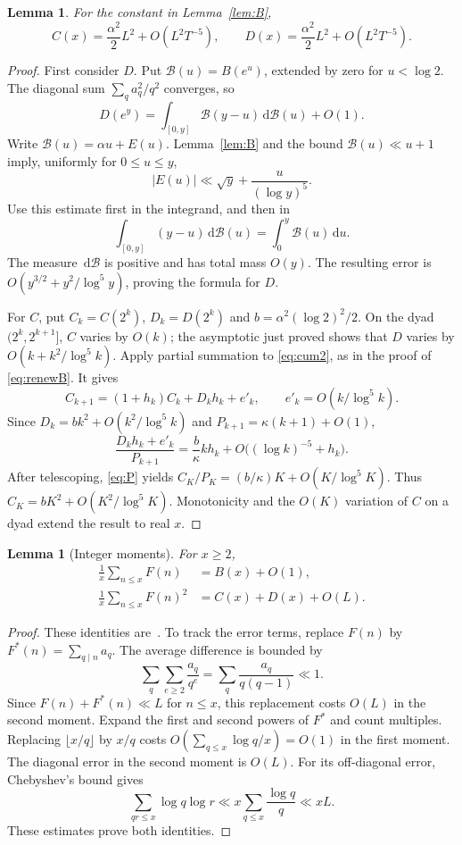 \documentclass[10pt]{article}
\newtheorem{lem}[thm]{Lemma}
\newcommand{\dd}{\,\mathrm d}
\begin{document}
\begin{lem}\label{lem:CD}
For the constant in Lemma~\ref{lem:B},
\begin{equation}\label{eq:CD}
 C(x)=\frac{\alpha^2}2 L^2+O(L^2T^{-5}),\qquad
 D(x)=\frac{\alpha^2}2 L^2+O(L^2T^{-5}).
\end{equation}
\end{lem}
\begin{proof}
First consider $D$. Put $\mathcal B(u)=B(e^u)$, extended by zero for $u<\log2$. The diagonal sum $\sum_q a_q^2/q^2$ converges, so
\[
 D(e^y)=\int_{[0,y]}\mathcal B(y-u)\dd\mathcal B(u)+O(1).
\]
Write $\mathcal B(u)=\alpha u+E(u)$. Lemma~\ref{lem:B} and the bound $\mathcal B(u)\ll u+1$ imply, uniformly for $0\leq u\leq y$,
\[
 |E(u)|\ll\sqrt y+\frac{u}{(\log y)^5}.
\]
Use this estimate first in the integrand, and then in
\[
 \int_{[0,y]}(y-u)\dd\mathcal B(u)=\int_0^y\mathcal B(u)\dd u.
\]
The measure $\dd\mathcal B$ is positive and has total mass $O(y)$. The resulting error is $O(y^{3/2}+y^2/\log^5y)$, proving the formula for $D$.

For $C$, put $C_k=C(2^k)$, $D_k=D(2^k)$ and $b=\alpha^2(\log2)^2/2$. On the dyad $(2^k,2^{k+1}]$, $C$ varies by $O(k)$; the asymptotic just proved shows that $D$ varies by $O(k+k^2/\log^5 k)$. Apply partial summation to \eqref{eq:cum2}, as in the proof of \eqref{eq:renewB}. It gives
\[
 C_{k+1}=(1+h_k)C_k+D_kh_k+e'_k,
 \qquad e'_k=O(k/\log^5 k).
\]
Since $D_k=bk^2+O(k^2/\log^5k)$ and $P_{k+1}=\kappa(k+1)+O(1)$,
\[
 \frac{D_kh_k+e'_k}{P_{k+1}}
 =\frac b\kappa kh_k+O\bigl((\log k)^{-5}+h_k\bigr).
\]
After telescoping, \eqref{eq:P} yields $C_K/P_K=(b/\kappa)K+O(K/\log^5 K)$. Thus $C_K=bK^2+O(K^2/\log^5K)$. Monotonicity and the $O(K)$ variation of $C$ on a dyad extend the result to real $x$.
\end{proof}

\begin{lem}[Integer moments]\label{lem:integer}
For $x\geq2$,
\begin{align}
 \frac1x\sum_{n\leq x}F(n)&=B(x)+O(1),\label{eq:int1}\\
 \frac1x\sum_{n\leq x}F(n)^2&=C(x)+D(x)+O(L).\label{eq:int2}
\end{align}
\end{lem}
\begin{proof}
These identities are~\cite[(2.8), (2.19)]{EGPS}. To track the error terms, replace $F(n)$ by $F^*(n)=\sum_{q\mid n}a_q$. The average difference is bounded by
\[
 \sum_q\sum_{e\geq2}\frac{a_q}{q^e}
 =\sum_q\frac{a_q}{q(q-1)}\ll1.
\]
Since $F(n)+F^*(n)\ll L$ for $n\leq x$, this replacement costs $O(L)$ in the second moment. Expand the first and second powers of $F^*$ and count multiples. Replacing $\lfloor x/q\rfloor$ by $x/q$ costs $O(\sum_{q\leq x}\log q/x)=O(1)$ in the first moment. The diagonal error in the second moment is $O(L)$. For its off-diagonal error, Chebyshev's bound gives
\[
 \sum_{qr\leq x}\log q\log r
 \ll x\sum_{q\leq x}\frac{\log q}{q}\ll xL.
\]
These estimates prove both identities.
\end{proof}
\end{document}
